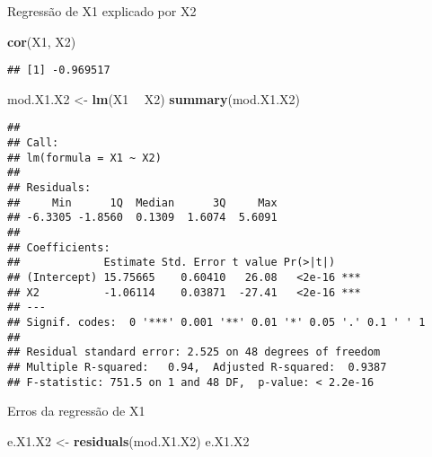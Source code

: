 \documentclass[]{article}
\newenvironment{Shaded}{\begin{snugshade}}{\end{snugshade}}
\newcommand{\KeywordTok}[1]{\textcolor[rgb]{0.13,0.29,0.53}{\textbf{#1}}}
\newcommand{\StringTok}[1]{\textcolor[rgb]{0.31,0.60,0.02}{#1}}
\newcommand{\OperatorTok}[1]{\textcolor[rgb]{0.81,0.36,0.00}{\textbf{#1}}}
\newcommand{\NormalTok}[1]{#1}
\begin{document}
Regressão de X1 explicado por X2

\begin{Shaded}
\begin{Highlighting}[]
\KeywordTok{cor}\NormalTok{(X1, X2)}
\end{Highlighting}
\end{Shaded}

\begin{verbatim}
## [1] -0.969517
\end{verbatim}

\begin{Shaded}
\begin{Highlighting}[]
\NormalTok{mod.X1.X2 <-}\StringTok{ }\KeywordTok{lm}\NormalTok{(X1 }\OperatorTok{~}\StringTok{ }\NormalTok{X2)}
\KeywordTok{summary}\NormalTok{(mod.X1.X2)}
\end{Highlighting}
\end{Shaded}

\begin{verbatim}
## 
## Call:
## lm(formula = X1 ~ X2)
## 
## Residuals:
##     Min      1Q  Median      3Q     Max 
## -6.3305 -1.8560  0.1309  1.6074  5.6091 
## 
## Coefficients:
##             Estimate Std. Error t value Pr(>|t|)    
## (Intercept) 15.75665    0.60410   26.08   <2e-16 ***
## X2          -1.06114    0.03871  -27.41   <2e-16 ***
## ---
## Signif. codes:  0 '***' 0.001 '**' 0.01 '*' 0.05 '.' 0.1 ' ' 1
## 
## Residual standard error: 2.525 on 48 degrees of freedom
## Multiple R-squared:   0.94,  Adjusted R-squared:  0.9387 
## F-statistic: 751.5 on 1 and 48 DF,  p-value: < 2.2e-16
\end{verbatim}

Erros da regressão de X1

\begin{Shaded}
\begin{Highlighting}[]
\NormalTok{e.X1.X2 <-}\StringTok{ }\KeywordTok{residuals}\NormalTok{(mod.X1.X2)}
\NormalTok{e.X1.X2}
\end{Highlighting}
\end{Shaded}
\end{document}
